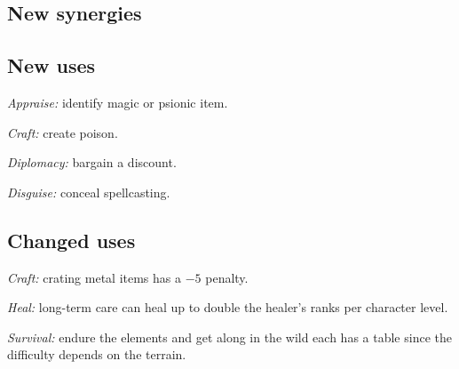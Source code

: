 \subsection{New synergies}

\subsection{New uses}
\begin{itemize*}
\item \textit{Appraise:} identify magic or psionic item.
\item \textit{Craft:} create poison.
\item \textit{Diplomacy:} bargain a discount.
\item \textit{Disguise:} conceal spellcasting.
\end{itemize*}

\subsection{Changed uses}
\begin{itemize*}
\item \textit{Craft:} crating metal items has a $-5$ penalty.
\item \textit{Heal:} long-term care can heal up to double the healer's ranks per character level.
\item \textit{Survival:} endure the elements and get along in the wild each has a table since the difficulty depends on the terrain.
\end{itemize*}

